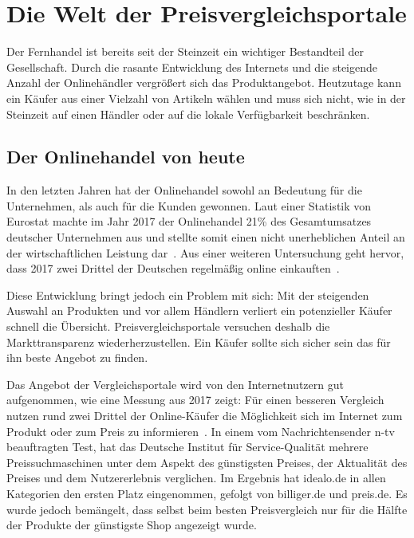 \section{Die Welt der Preisvergleichsportale}
\label{sec:einleitung}

Der Fernhandel ist bereits seit der Steinzeit ein wichtiger Bestandteil der Gesellschaft.
Durch die rasante Entwicklung des Internets und die steigende Anzahl der Onlinehändler vergrößert sich das
Produktangebot.
Heutzutage kann ein Käufer aus einer Vielzahl von Artikeln wählen und muss sich nicht, wie in der Steinzeit auf
einen Händler oder auf die lokale Verfügbarkeit beschränken.

\subsection{Der Onlinehandel von heute}
\label{subsec:onlinehandel-heute}

In den letzten Jahren hat der Onlinehandel sowohl an Bedeutung für die Unternehmen, als auch für die Kunden gewonnen.
Laut einer Statistik von Eurostat machte im Jahr 2017 der Onlinehandel 21\% des Gesamtumsatzes deutscher Unternehmen
aus und stellte somit einen nicht unerheblichen Anteil an der wirtschaftlichen Leistung
dar~\cite{statista:anteil-gesamtumsatz-europa}.
Aus einer weiteren Untersuchung geht hervor, dass 2017 zwei Drittel der Deutschen regelmäßig online
einkauften~\cite{statista:anteil-online-kaeufer-europa}.

Diese Entwicklung bringt jedoch ein Problem mit sich: Mit der steigenden Auswahl an Produkten und vor allem Händlern
verliert ein potenzieller Käufer schnell die Übersicht.
Preisvergleichsportale versuchen deshalb die Markttransparenz wiederherzustellen.
Ein Käufer sollte sich sicher sein das für ihn beste Angebot zu finden.

Das Angebot der Vergleichsportale wird von den Internetnutzern gut aufgenommen, wie eine Messung aus 2017 zeigt:
Für einen besseren Vergleich nutzen rund zwei Drittel der Online-Käufer die Möglichkeit sich im Internet zum Produkt
oder zum Preis zu informieren~\cite{statista:internetnutzer-preisvergleich-deutschland,
statista:anteil-online-kaeufe-deutschland}.
In einem vom Nachrichtensender n-tv beauftragten Test\footnotemark, hat das Deutsche Institut für Service-Qualität
mehrere Preissuchmaschinen unter dem Aspekt des günstigsten Preises, der Aktualität des Preises und dem
Nutzererlebnis verglichen.
Im Ergebnis hat idealo.de in allen Kategorien den ersten Platz eingenommen, gefolgt von billiger.de und preis.de.
Es wurde jedoch bemängelt, dass selbst beim besten Preisvergleich nur für die Hälfte der Produkte der günstigste
Shop angezeigt wurde.


